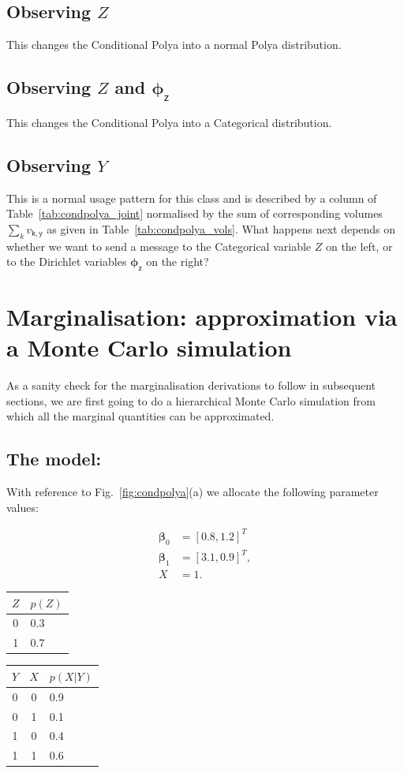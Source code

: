 \documentclass[oneside,english]{scrbook}
\begin{document}
\subsection{Observing $Z$}
This changes the Conditional Polya into a normal Polya distribution.

\subsection{Observing $Z$ and $\bm{\phi}_{\mathsf{z}}$}
This changes the Conditional Polya into a Categorical distribution.

\subsection{Observing $Y$}
This is a normal usage pattern for this class and is described by a
column of Table~\ref{tab:condpolya_joint} normalised by the sum of
corresponding volumes $\sum_kv_{\mathsf{k,y}}$ as given in
Table~\ref{tab:condpolya_vols}. What happens next depends on whether
we want to send a message to the Categorical variable $Z$ on the left,
or to the Dirichlet variables $\bm{\phi}_{\mathsf{z}}$ on the right?

\section{Marginalisation: approximation via a Monte Carlo simulation}
As a sanity check for the marginalisation derivations to follow in
subsequent sections, we are first going to do a hierarchical Monte
Carlo simulation from which all the marginal quantities can be
approximated.

\subsection{The model:}
With reference to Fig.~\ref{fig:condpolya}(a) we allocate the
following parameter values:

\parbox{0.3\textwidth}{
  \centering
  \begin{align*}
    \bm{\beta}_0 &= [0.8, 1.2]^T \\
    \bm{\beta}_1 &= [3.1, 0.9]^T,\\
    X &= 1.
  \end{align*}
}
\parbox{0.3\textwidth}{
  \centering
  \begin{tabular}{c|l}
    $Z$ & $p(Z)$\\ \hline
    0 & 0.3 \\
    1 & 0.7
  \end{tabular}
}
\parbox{0.3\textwidth}{
  \centering
  \begin{tabular}{c c|l}
    $Y$ & $X$ & $p(X|Y)$\\ \hline
    0 & 0 & 0.9 \\
    0 & 1 & 0.1 \\
    1 & 0 & 0.4 \\
    1 & 1 & 0.6
  \end{tabular}
}
\end{document}
